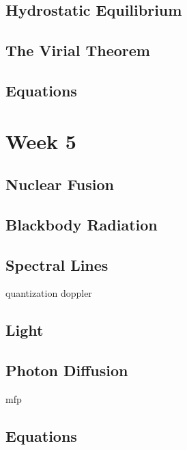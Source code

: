 \documentclass[a4paper,10pt]{article}
\begin{document}
\subsection{Hydrostatic Equilibrium}

\subsection{The Virial Theorem}

\subsection{Equations}



\newpage
\section{Week 5}

\subsection{Nuclear Fusion}

\subsection{Blackbody Radiation}

\subsection{Spectral Lines}
quantization
doppler

\subsection{Light}

\subsection{Photon Diffusion}
mfp

\subsection{Equations}


\end{document}
